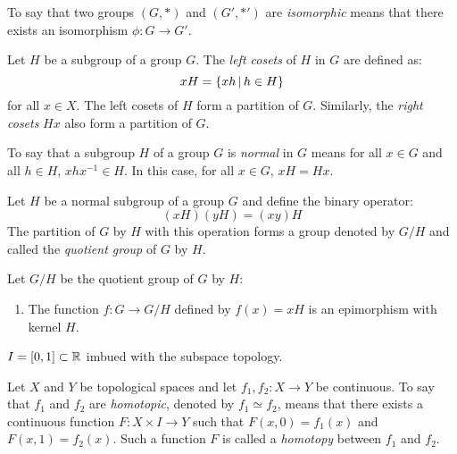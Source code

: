 \documentclass[letterpaper,12pt,fleqn]{article}
\newcommand{\p}{\phi}
\begin{document}
\begin{definition}[Isomorphism]
  To say that two groups \((G,*)\) and \((G',*')\) are \emph{isomorphic} means that there exists an isomorphism
  \(\p:G\to G'\).
\end{definition}

\begin{definition}[Coset]
  Let \(H\) be a subgroup of a group \(G\).  The \emph{left cosets} of \(H\) in \(G\) are defined as:
  \[xH=\left\{{xh}\,\middle|\,{h\in H}\right\}\]
  for all \(x\in X\).  The left cosets of \(H\) form a partition of \(G\).  Similarly, the \emph{right cosets}
  \(Hx\) also form a partition of \(G\).
\end{definition}

\begin{definition}[Normal]
  To say that a subgroup \(H\) of a group \(G\) is \emph{normal} in \(G\) means for all \(x\in G\) and all
  \(h\in H\), \(xhx^{-1}\in H\).  In this case, for all \(x\in G\), \(xH=Hx\).
\end{definition}

\begin{definition}[Quotient]
  Let \(H\) be a normal subgroup of a group \(G\) and define the binary operator:
  \[(xH)(yH)=(xy)H\]
  The partition of \(G\) by \(H\) with this operation forms a group denoted by \(G/H\) and called the
  \emph{quotient group} of \(G\) by \(H\).
\end{definition}

\begin{properties}[Quotient]
  Let \(G/H\) be the quotient group of \(G\) by \(H\):
  \begin{enumerate}
  \item The function \(f:G\to G/H\) defined by \(f(x)=xH\) is an epimorphism with kernel \(H\).
  \end{enumerate}
\end{properties}

\begin{notation}
  \(I=[0,1]\subset\mathbb{R}\) imbued with the subspace topology.
\end{notation}

\begin{definition}[Homotopy]
  Let \(X\) and \(Y\) be topological spaces and let \(f_1,f_2:X\to Y\) be continuous.  To say that \(f_1\) and
  \(f_2\) are \emph{homotopic}, denoted by \(f_1\simeq f_2\), means that there exists a continuous function
  \(F:X\times I\to Y\) such that \(F(x,0)=f_1(x)\) and \(F(x,1)=f_2(x)\).  Such a function \(F\) is called a
  \emph{homotopy} between \(f_1\) and \(f_2\).
\end{definition}
\end{document}
